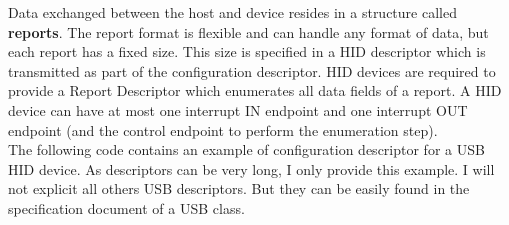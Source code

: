 \documentclass[pdftex,10pt,a4paper]{report}
\begin{document}
Data exchanged between the host and device resides in a structure called \textbf{reports}. The report format is flexible and can handle any format of data, but each report has a fixed size. This size is specified in a HID descriptor which is transmitted as part of the configuration descriptor.
HID devices are required to provide a Report Descriptor which enumerates all data fields of a report. A HID device can have at most one interrupt IN endpoint and one interrupt OUT endpoint (and the control endpoint to perform the enumeration step).
\\

The following code contains an example of configuration descriptor for a USB HID device. As descriptors can be very long, I only provide this example. I will not explicit all others USB descriptors. But they can be easily found in the specification document of a USB class.
\end{document}
